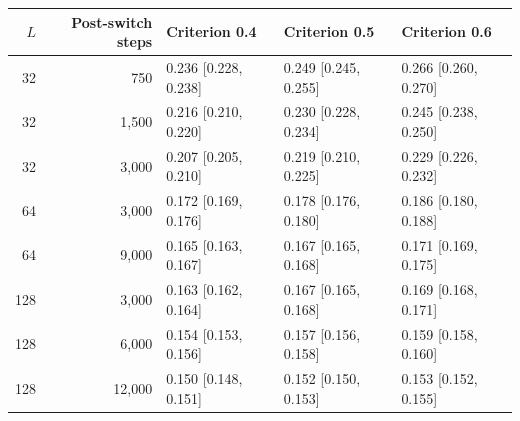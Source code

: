 \begin{center}
\begin{minipage}{\linewidth}\centering
\captionsetup{type=table,hypcap=false}
\caption{Observation period and the fraction $f_{50}$ at which half the markets reached a Sell majority, with technical traders held and dealer depth $h=100$. Entries are interpolated $f_{50}$ with 95\% whole-market bootstrap intervals over 50 starting markets. Criterion columns give the interior Sell fraction a run had to reach to count as a majority. These runs used one fixed set of tested fractions rather than the adaptively refined set, so interpolated midpoints can differ slightly from those in Supplementary Table~\ref{tab:finite-size-scaling} for the same runs, for example 0.167 rather than 0.166 at $L=128$ and 0.219 rather than 0.216 at $L=32$.}
\label{tab:revision-horizons}
\footnotesize
\begin{tabular}{rrlll}
\toprule
$L$ & Post-switch steps & Criterion 0.4 & Criterion 0.5 & Criterion 0.6 \\
\midrule
32 & 750 & 0.236 [0.228, 0.238] & 0.249 [0.245, 0.255] & 0.266 [0.260, 0.270] \\
32 & 1{,}500 & 0.216 [0.210, 0.220] & 0.230 [0.228, 0.234] & 0.245 [0.238, 0.250] \\
32 & 3{,}000 & 0.207 [0.205, 0.210] & 0.219 [0.210, 0.225] & 0.229 [0.226, 0.232] \\
64 & 3{,}000 & 0.172 [0.169, 0.176] & 0.178 [0.176, 0.180] & 0.186 [0.180, 0.188] \\
64 & 9{,}000 & 0.165 [0.163, 0.167] & 0.167 [0.165, 0.168] & 0.171 [0.169, 0.175] \\
128 & 3{,}000 & 0.163 [0.162, 0.164] & 0.167 [0.165, 0.168] & 0.169 [0.168, 0.171] \\
128 & 6{,}000 & 0.154 [0.153, 0.156] & 0.157 [0.156, 0.158] & 0.159 [0.158, 0.160] \\
128 & 12{,}000 & 0.150 [0.148, 0.151] & 0.152 [0.150, 0.153] & 0.153 [0.152, 0.155] \\
\bottomrule
\end{tabular}
\end{minipage}
\end{center}



